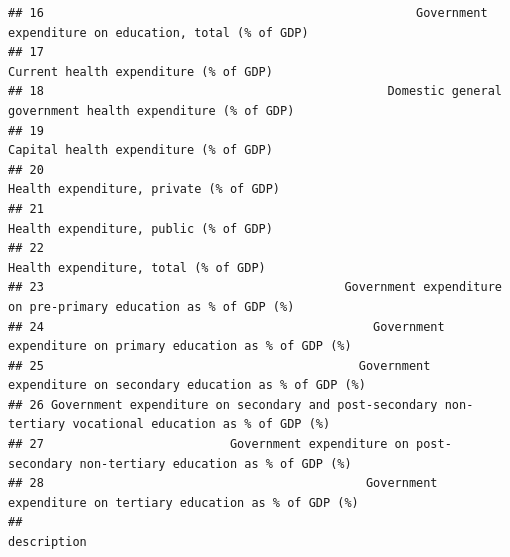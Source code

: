 \documentclass[
]{article}
\begin{document}
\begin{verbatim}
## 16                                                    Government expenditure on education, total (% of GDP)
## 17                                                                    Current health expenditure (% of GDP)
## 18                                                Domestic general government health expenditure (% of GDP)
## 19                                                                    Capital health expenditure (% of GDP)
## 20                                                                   Health expenditure, private (% of GDP)
## 21                                                                    Health expenditure, public (% of GDP)
## 22                                                                     Health expenditure, total (% of GDP)
## 23                                          Government expenditure on pre-primary education as % of GDP (%)
## 24                                              Government expenditure on primary education as % of GDP (%)
## 25                                            Government expenditure on secondary education as % of GDP (%)
## 26 Government expenditure on secondary and post-secondary non-tertiary vocational education as % of GDP (%)
## 27                          Government expenditure on post-secondary non-tertiary education as % of GDP (%)
## 28                                             Government expenditure on tertiary education as % of GDP (%)
##                                                                                                                                                                                                                                                                                                                                                                                                                                                                                                                                                                                                                                                                                                                                                                                                                                                                                                                                                                                                                                                                                                                                                                                                                                                                                                                                                                                                                                          description

\end{verbatim}
\end{document}
